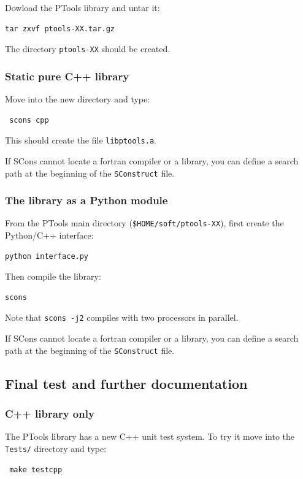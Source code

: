 \documentclass[12pt,a4paper]{article}
\begin{document}
Dowload the PTools library and untar it:

\begin{verbatim}
tar zxvf ptools-XX.tar.gz
\end{verbatim}
The directory {\tt ptools-XX} should be created.


\subsubsection{Static pure C++ library}

Move into the new directory and type:

\begin{verbatim}
 scons cpp
\end{verbatim}

This should create the file {\tt libptools.a}.

If SCons cannot locate a fortran compiler or a library, you can define a search path at the beginning of
the {\tt SConstruct} file.

\subsubsection{The library as a Python module}

From the PTools main directory ({\tt \$HOME/soft/ptools-XX}), 
first create the Python/C++ interface:
\begin{verbatim}
python interface.py
\end{verbatim}

Then compile the library:
\begin{verbatim}
scons
\end{verbatim}

Note that {\tt scons -j2} compiles with two processors in parallel.

If SCons cannot locate a fortran compiler or a library, you can define a search path at the beginning of
the {\tt SConstruct} file.


\subsection{Final test and further documentation}

\subsubsection{C++ library only}

The PTools library has a new C++ unit test system. To try it move into the {\tt Tests/} directory and
type: 
\begin{verbatim}
 make testcpp
\end{verbatim}
\end{document}
